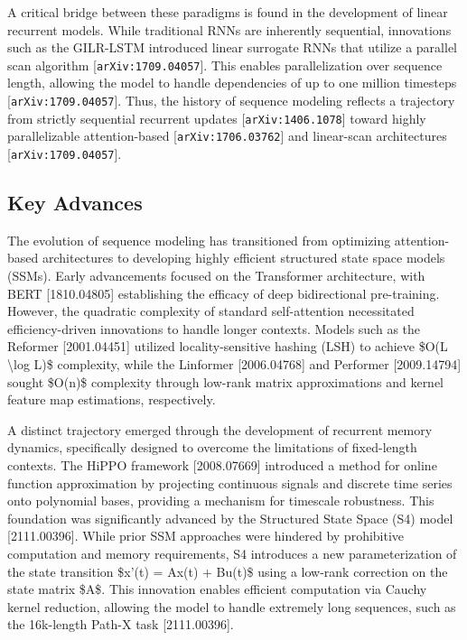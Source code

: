 \documentclass[11pt]{article}
\begin{document}
A critical bridge between these paradigms is found in the development of linear recurrent models. While traditional RNNs are inherently sequential, innovations such as the GILR-LSTM introduced linear surrogate RNNs that utilize a parallel scan algorithm [\texttt{arXiv:1709.04057}]. This enables parallelization over sequence length, allowing the model to handle dependencies of up to one million timesteps [\texttt{arXiv:1709.04057}]. Thus, the history of sequence modeling reflects a trajectory from strictly sequential recurrent updates [\texttt{arXiv:1406.1078}] toward highly parallelizable attention-based [\texttt{arXiv:1706.03762}] and linear-scan architectures [\texttt{arXiv:1709.04057}].

\subsection{Key Advances}

The evolution of sequence modeling has transitioned from optimizing attention-based architectures to developing highly efficient structured state space models (SSMs). Early advancements focused on the Transformer architecture, with BERT [1810.04805] establishing the efficacy of deep bidirectional pre-training. However, the quadratic complexity of standard self-attention necessitated efficiency-driven innovations to handle longer contexts. Models such as the Reformer [2001.04451] utilized locality-sensitive hashing (LSH) to achieve \$O(L \textbackslash{}log L)\$ complexity, while the Linformer [2006.04768] and Performer [2009.14794] sought \$O(n)\$ complexity through low-rank matrix approximations and kernel feature map estimations, respectively.

A distinct trajectory emerged through the development of recurrent memory dynamics, specifically designed to overcome the limitations of fixed-length contexts. The HiPPO framework [2008.07669] introduced a method for online function approximation by projecting continuous signals and discrete time series onto polynomial bases, providing a mechanism for timescale robustness. This foundation was significantly advanced by the Structured State Space (S4) model [2111.00396]. While prior SSM approaches were hindered by prohibitive computation and memory requirements, S4 introduces a new parameterization of the state transition \$x'(t) = Ax(t) + Bu(t)\$ using a low-rank correction on the state matrix \$A\$. This innovation enables efficient computation via Cauchy kernel reduction, allowing the model to handle extremely long sequences, such as the 16k-length Path-X task [2111.00396].
\end{document}
